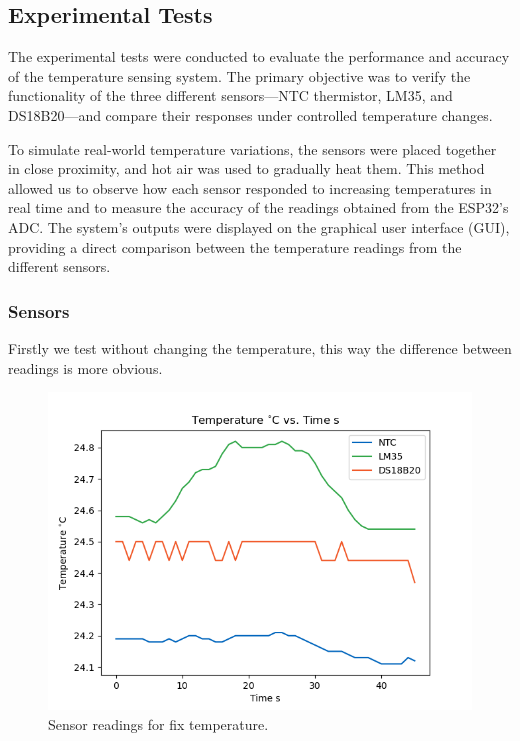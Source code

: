 \documentclass[12pt]{article}
\begin{document}
\subsection{Experimental Tests}

    The experimental tests were conducted to evaluate the performance and accuracy of the temperature sensing system. The primary objective was to verify the functionality of the three different sensors—NTC thermistor, LM35, and DS18B20—and compare their responses under controlled temperature changes.

    To simulate real-world temperature variations, the sensors were placed together in close proximity, and hot air was used to gradually heat them. This method allowed us to observe how each sensor responded to increasing temperatures in real time and to measure the accuracy of the readings obtained from the ESP32's ADC. The system's outputs were displayed on the graphical user interface (GUI), providing a direct comparison between the temperature readings from the different sensors.

        
    \subsubsection{ Sensors }

        Firstly we test without changing the temperature, this way the difference between readings is more obvious.
        
        \begin{figure}[H] 
            \centering
            \includegraphics*[scale = 0.5]{images/TempFixTest.png}
            \caption{Sensor readings for fix temperature.}
            \label{fig:FixTemp}
        \end{figure}
\end{document}

